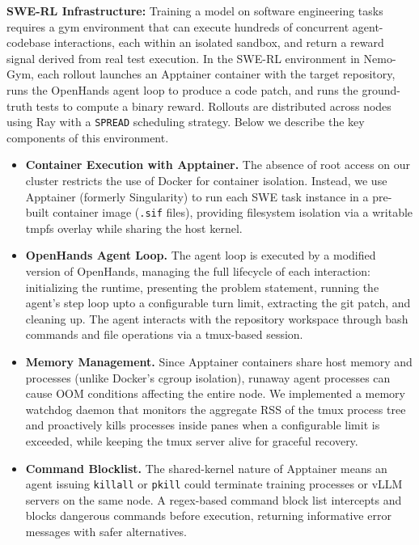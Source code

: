\textbf{SWE-RL Infrastructure: }
Training a model on software engineering tasks requires a gym environment that can execute hundreds of concurrent agent-codebase interactions, each within an isolated sandbox, and return a reward signal derived from real test execution. In the SWE-RL environment in Nemo-Gym, each rollout launches an Apptainer container with the target repository, runs the OpenHands agent loop to produce a code patch, and runs the ground-truth tests to compute a binary reward. Rollouts are distributed across nodes using Ray with a \texttt{SPREAD} scheduling strategy. Below we describe the key components of this environment.

\begin{itemize}
    \item \textbf{Container Execution with Apptainer.} The absence of root access on our cluster restricts the use of Docker for container isolation. Instead, we use Apptainer (formerly Singularity) to run each SWE task instance in a pre-built container image (\texttt{.sif} files), providing filesystem isolation via a writable tmpfs overlay while sharing the host kernel.

    \item \textbf{OpenHands Agent Loop.} The agent loop is executed by a modified version of OpenHands, managing the full lifecycle of each interaction: initializing the runtime, presenting the problem statement, running the agent's step loop upto a configurable turn limit, extracting the git patch, and cleaning up. The agent interacts with the repository workspace through bash commands and file operations via a tmux-based session.

    \item \textbf{Memory Management.} Since Apptainer containers share host memory and processes (unlike Docker's cgroup isolation), runaway agent processes can cause OOM conditions affecting the entire node. We implemented a memory watchdog daemon that monitors the aggregate RSS of the tmux process tree and proactively kills processes inside panes when a configurable limit is exceeded, while keeping the tmux server alive for graceful recovery.

    \item \textbf{Command Blocklist.} The shared-kernel nature of Apptainer means an agent issuing \texttt{killall} or \texttt{pkill} could terminate training processes or vLLM servers on the same node. A regex-based command block list intercepts and blocks dangerous commands before execution, returning informative error messages with safer alternatives.


\end{itemize}
